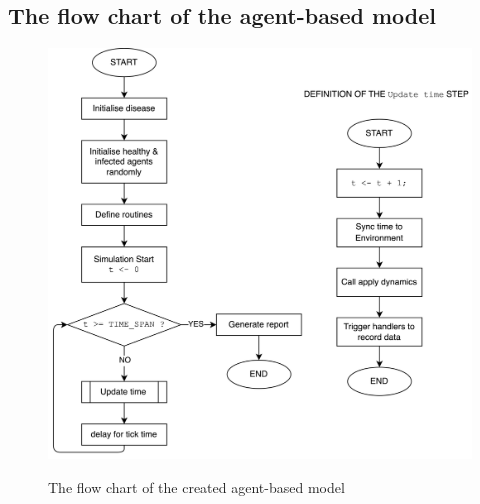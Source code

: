 \documentclass[12pt]{article}
\begin{document}
\begin{appendices}
	\subsection{The flow chart of the agent-based model}
	\begin{figure}[ht]
		\centering
		\includegraphics[width=\linewidth]{./assets/model-flow-chart.png}
        \label{fig:model-flow-chart} 
		\caption{\scriptsize \sffamily The flow chart of the created agent-based model}
	\end{figure}
\end{appendices}
\end{document}
